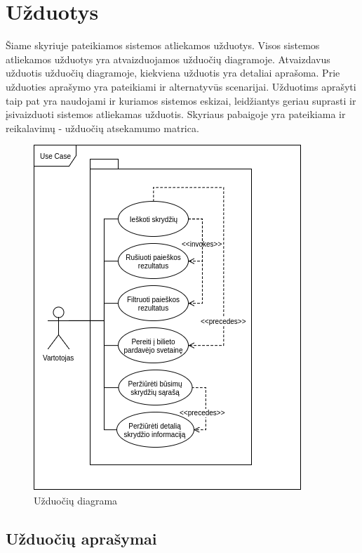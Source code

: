 \documentclass{VUMIFPSkursinis}
\begin{document}
        \section{Užduotys}
        Šiame skyriuje pateikiamos sistemos atliekamos užduotys. Visos sistemos atliekamos užduotys yra atvaizduojamos užduočių diagramoje. Atvaizdavus užduotis užduočių diagramoje, kiekviena užduotis yra detaliai aprašoma. Prie užduoties aprašymo yra pateikiami ir alternatyvūs scenarijai. Užduotims aprašyti taip pat yra naudojami ir kuriamos sistemos eskizai, leidžiantys geriau suprasti ir įsivaizduoti sistemos atliekamas užduotis. Skyriaus pabaigoje yra pateikiama ir reikalavimų - užduočių atsekamumo matrica.
            \begin{figure}[H]
                \centering
                \includegraphics[scale=1]{img/use_case}
                \caption{Užduočių diagrama}
                \label{Užduočių diagrama}
            \end{figure}
            \subsection{Užduočių aprašymai}
                
\end{document}
